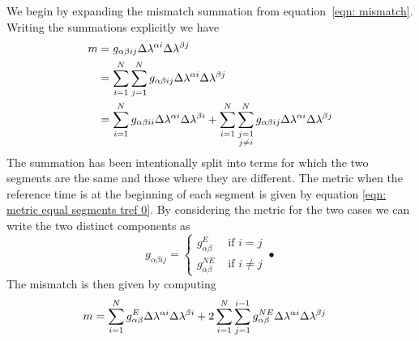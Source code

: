 We begin by expanding the mismatch summation from equation~\eqref{eqn: mismatch}.
Writing the summations explicitly we have
\begin{align}
m & = g_{\alpha\beta i j}\Delta\lambda^{\alpha i}\Delta\lambda^{\beta j}  \\
&=\sum_{i=1}^{N}\sum_{j=1}^{N}g_{\alpha\beta i j}\Delta\lambda^{\alpha i}\Delta\lambda^{\beta j}  \\
&= \sum_{i=1}^{N}g_{\alpha\beta i i}\Delta\lambda^{\alpha i}\Delta\lambda^{\beta i} 
+ \sum_{i=1}^{N} \sum_{\substack{j=1\\ j \ne i}}^{N} g_{\alpha \beta ij}\Delta\lambda^{\alpha i}\Delta\lambda^{\beta j}  
\end{align}
The summation has been intentionally split into terms for which the two segments
are the same and those where they are different. The metric when the reference
time is at the beginning of each segment is given by equation 
\eqref{eqn: metric equal segments tref 0}. By considering the metric for the two cases we can write
the two distinct components as
\begin{equation}
g_{\alpha\beta ij} = \left\{
\begin{array}{cc}
g_{\alpha\beta}^{E} & \textrm{ if } i =j \\
g_{\alpha\beta}^{NE} & \textrm{ if } i  \ne j 
\end{array}•\right. 
\end{equation}
The mismatch is then given by computing
\begin{align}
m &= \sum_{i=1}^{N}g_{\alpha\beta}^{E}\Delta\lambda^{\alpha i}\Delta\lambda^{\beta i} 
+ 2\sum_{i=1}^{N} \sum_{j=1}^{i-1} g_{\alpha \beta}^{NE}\Delta\lambda^{\alpha i}\Delta\lambda^{\beta j} 
\label{eqn: mismatch sep}
\end{align}


